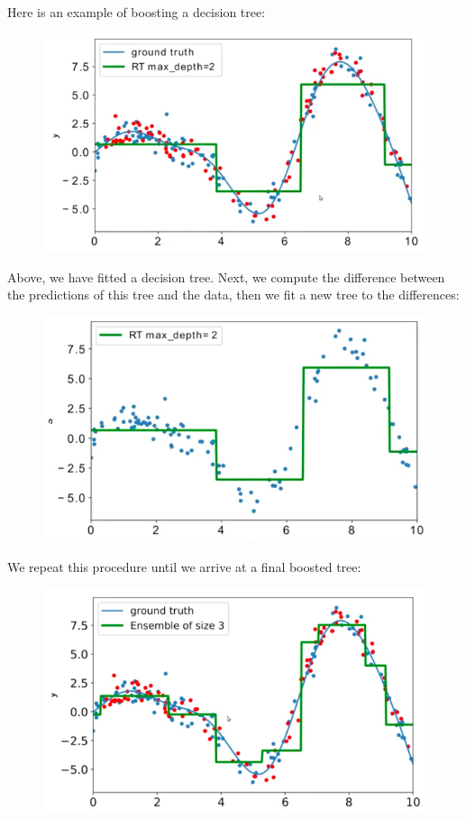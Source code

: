 \newpage
\begin{frameex}
Here is an example of boosting a decision tree:
\begin{figure}[H]
\centering
\includegraphics[scale=0.4]{treeboosting.png}
\end{figure}
Above, we have fitted a decision tree. Next, we compute the difference between the predictions of this tree and the data, then we fit a new tree to the differences:
\begin{figure}[H]
\centering
\includegraphics[scale=0.4]{treeboosting2.png}
\end{figure}
We repeat this procedure until we arrive at a final boosted tree:
\begin{figure}[H]
\centering
\includegraphics[scale=0.4]{treeboosting3.png}
\end{figure}
\end{frameex}




